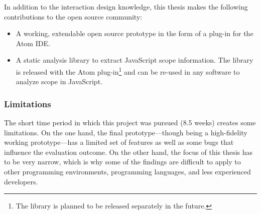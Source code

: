 In addition to the interaction design knowledge, this thesis makes the
following contributions to the open source community:

\begin{itemize}
\itemsep1pt\parskip0pt
\item
  A working, extendable open source prototype in the form of a plug-in
  for the Atom IDE.
\item
  A static analysis library to extract JavaScript scope information. The
  library is released with the Atom
  plug-in\footnote{The library is planned to be released separately in the future.}
  and can be re-used in any software to analyze scope in JavaScript.
\end{itemize}

\subsubsection{Limitations}\label{limitations}

The short time period in which this project was pursued (8.5 weeks)
creates some limitations. On the one hand, the final prototype—though
being a high-fidelity working prototype—has a limited set of features as
well as some bugs that influence the evaluation outcome. On the other
hand, the focus of this thesis has to be very narrow, which is why some
of the findings are difficult to apply to other programming
environments, programming languages, and less experienced developers.
